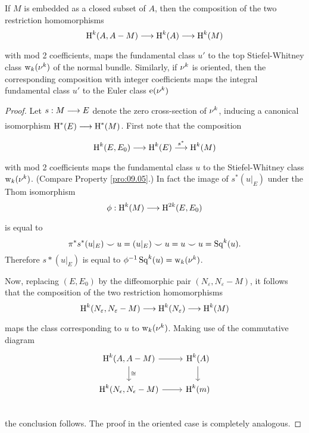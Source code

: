 \documentclass[../main]{subfiles}
\begin{document}
\begin{theorem}\label{thm:11.3}
If $M$ is embedded as a closed subset of $A$, then the composition of the two restriction homomorphisms
\[
\homology^{k}(A, A-M) \varrightarrow{} \homology^{k}(A) \varrightarrow{} \homology^{k}(M)
\]
with mod 2 coefficients, maps the fundamental class $u'$ to the top Stiefel-Whitney class $\operatorname{w}_{k}(\nu_{}^{k})$ of the normal bundle. Similarly, if $\nu_{}^k$ is oriented, then the corresponding composition with integer coefficients maps the integral fundamental class $u'$ to the Euler class $\operatorname{e}(\nu_{}^k)$
\end{theorem}

\begin{proof} 
Let $s: M \varrightarrow{} E$ denote the zero cross-section of $\nu_{}^{k}$, inducing a canonical isomorphism $\homology^{*}(E) \varrightarrow{} \homology^{*}(M)$. First note that the composition
\[
\homology^{k}(E, E_{0}) \varrightarrow{} \homology^{k}(E) \varrightarrow{s^*} \homology^{k}(M)
\]
with mod 2 coefficients maps the fundamental class $u$ to the Stiefel-Whitney class $\operatorname{w}_{k}(\nu_{}^{k})$. (Compare Property \ref{pro:09.05}.) In fact the image of $s^*(u|_E)$ under the Thom isomorphism
\[
\phi: \homology^{k}(M) \varrightarrow{} \homology^{2k}(E, E_{0})
\]
is equal to \[\pi^{*} s^{*}(u|_E) \smile u=(u|_E) \smile u=u \smile u=\operatorname{Sq}^{k}(u).\] Therefore $s *(u|_E)$ is equal to $\phi^{-1} \operatorname{Sq}^{k}(u)=\operatorname{w}_{k}(\nu_{}^{k})$.

Now, replacing $(E,E_{0})$ by the diffeomorphic pair $(N_{\varepsilon}, N_{\varepsilon}-M)$, it follows that the composition of the two restriction homomorphisms
\[
\homology^{k}(N_{\varepsilon}, N_{\varepsilon}-M) \varrightarrow{} \homology^{k}(N_{\varepsilon}) \varrightarrow{} \homology^{k}(M)
\]
maps the class corresponding to $u$ to $\operatorname{w}_{k}(\nu_{}^{k})$. Making use of the commutative diagram
\[\begin{tikzcd}
\homology^k (A, A-M) \arrow[d, "\cong"] \arrow[r] & \homology^k (A) \arrow[d] \\
\homology^k(N_\epsilon, N_\epsilon - M) \arrow[r] & \homology^k(m) \\
\end{tikzcd}\]
the conclusion follows. The proof in the oriented case is completely analogous.
\end{proof}
\end{document}
